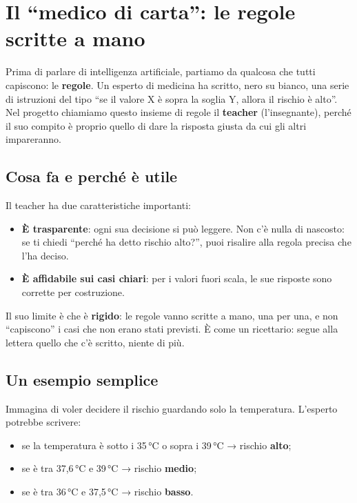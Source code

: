 \chapter{Il ``medico di carta'': le regole scritte a mano}\label{cap:p1-teacher}


Prima di parlare di intelligenza artificiale, partiamo da qualcosa che tutti
capiscono: le \textbf{regole}. Un esperto di medicina ha scritto, nero su
bianco, una serie di istruzioni del tipo ``se il valore X è sopra la soglia Y,
allora il rischio è alto''. Nel progetto chiamiamo questo insieme di regole
il \textbf{teacher} (l'insegnante), perché il suo compito è proprio quello di
dare la risposta giusta da cui gli altri impareranno.

\section{Cosa fa e perché è utile}\label{sec:p1-teacher-cosa}

Il teacher ha due caratteristiche importanti:

\begin{itemize}
  \item \textbf{È trasparente}: ogni sua decisione si può leggere. Non c'è
        nulla di nascosto: se ti chiedi ``perché ha detto rischio alto?'',
        puoi risalire alla regola precisa che l'ha deciso.
  \item \textbf{È affidabile sui casi chiari}: per i valori fuori scala, le
        sue risposte sono corrette per costruzione.
\end{itemize}

Il suo limite è che è \textbf{rigido}: le regole vanno scritte a mano, una per
una, e non ``capiscono'' i casi che non erano stati previsti. È come un
ricettario: segue alla lettera quello che c'è scritto, niente di più.

\section{Un esempio semplice}\label{sec:p1-teacher-esempio}

Immagina di voler decidere il rischio guardando solo la temperatura. L'esperto
potrebbe scrivere:

\begin{itemize}
  \item se la temperatura è sotto i 35\,°C o sopra i 39\,°C → rischio \textbf{alto};
  \item se è tra 37,6\,°C e 39\,°C → rischio \textbf{medio};
  \item se è tra 36\,°C e 37,5\,°C → rischio \textbf{basso}.
\end{itemize}

